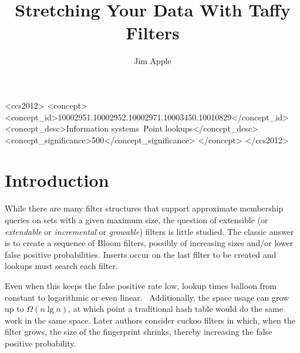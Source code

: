\documentclass[manuscript,screen,review]{acmart}
\begin{document}
\title{Stretching Your Data With Taffy Filters}
\author{Jim Apple}

\begin{abstract}
\end{abstract}

\begin{CCSXML}
<ccs2012>
   <concept>
       <concept_id>10002951.10002952.10002971.10003450.10010829</concept_id>
       <concept_desc>Information systems~Point lookups</concept_desc>
       <concept_significance>500</concept_significance>
       </concept>
 </ccs2012>
\end{CCSXML}



\maketitle


\section{Introduction}

While there are many filter structures that support approximate membership queries on sets with a given maximum size, the question of extensible (or {\itshape extendable} or {\itshape incremental} or {\itshape growable}) filters is little studied.
The classic answer is to create a sequence of Bloom filters, possibly of increasing sizes and/or lower false positive probabilities.
Inserts occur on the last filter to be created and lookups must search each filter.

Even when this keeps the false positive rate low, lookup times balloon from constant to logarithmic or even linear.~\cite{psw,logarithm,consistent-cuckoo} %
Additionally, the space usage can grow up to $\Omega(n \lg n)$, at which point a traditional hash table would do the same work in the same space.
Later authors consider cuckoo filters in which, when the filter grows, the size of the fingerprint shrinks, thereby increasing the false positive probability.~\cite{logarithm,morton-journal,vacuum,rsqf}
\end{document}

